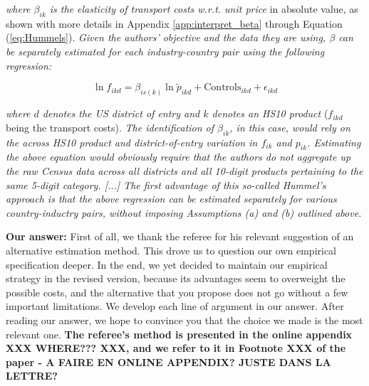 \documentclass[a4paper,11pt]{article}
\begin{document}
\textit{where $\beta_{ik}$ is the elasticity of transport costs w.r.t. unit price} in absolute value, as shown with more details in Appendix \ref{app:interpret_beta} through Equation (\ref{eq:Hummels}). \textit{Given the authors' objective and the data they are using, $\beta$ can be separately estimated
for each industry-country pair using the following regression:}

\begin{equation}
\ln f_{ikd} = \beta_{is(k)}\ln \tilde{p}_{ikd} + \text{Controls}_{ikd} +\epsilon_{ikd} \label{eq:estimation_ref1}
\end{equation}

\textit{where $d$ denotes the US district of entry and $k$ denotes an HS10 product} ($f_{ikd}$ being the transport costs). \textit{The
identification of $\beta_{ik}$, in this case, would rely on the across HS10 product and
district-of-entry variation in $f_{ik}$ and $p_{ik}$. Estimating the above equation would
obviously require that the authors do not aggregate up the raw Census data
across all districts and all 10-digit products pertaining to the same 5-digit category. [...] The first advantage of this so-called Hummel's approach is that the above regression can be estimated separately for various country-inductry pairs, without imposing Assumptions (a) and (b) outlined above.}

\textbf{Our answer:} First of all, we thank the referee for his relevant suggestion of an alternative estimation method. This drove us to question our own empirical specification deeper. In the end, we yet decided to maintain our empirical strategy in the revised version, because its advantages seem to overweight the possible costs, and the alternative that you propose does not go without a few important limitations. We develop each line of argument in our answer. After reading our answer, we hope to convince you that the choice we made is the most relevant one. \textbf{The referee's method is presented in the online appendix XXX WHERE??? XXX, and we refer to it in Footnote XXX of the paper - A FAIRE EN ONLINE APPENDIX? JUSTE DANS LA LETTRE? }
\end{document}
